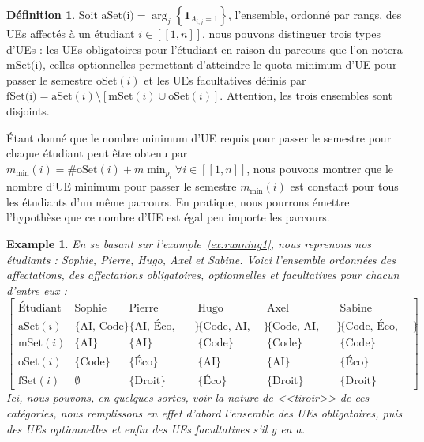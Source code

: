 \documentclass{rapport}
\theoremstyle{definition}
\newtheorem{definition}{Définition}
\theoremstyle{remark}
\theoremstyle{plain}
\newtheorem{example}{Example}
\theoremstyle{definition}
\theoremstyle{remark}
\newcommand{\llbracket}{[\![}
\newcommand{\rrbracket}{]\!]}
\begin{document}
\begin{definition}
    Soit $\text{aSet(i)}=\arg_j\left\{\mathbf{1}_{A_{i,j}=1}\right\}$, l'ensemble, ordonné par rangs, des UEs affectés à un étudiant $i\in \llbracket 1,n\rrbracket$, nous pouvons distinguer trois types d'UEs :
    les UEs obligatoires pour l'étudiant en raison du parcours que l'on notera $\text{mSet(i)}$,
    celles optionnelles permettant d'atteindre le quota minimum d'UE pour passer le semestre $\text{oSet}(i)$
    et les UEs facultatives définis par $\text{fSet(i)} = \text{aSet}(i)\setminus[\text{mSet}(i)\cup\text{oSet}(i)]$.
    Attention, les trois ensembles sont disjoints.
\end{definition}
Étant donné que le nombre minimum d'UE requis pour passer le semestre pour chaque étudiant peut être obtenu par $m_{\min}(i)=\#\text{oSet}(i)+m\!\min_{p_i} \forall i \in \llbracket 1,n \rrbracket$,
nous pouvons montrer que le nombre d'UE minimum pour passer le semestre $m_{\min}(i)$ est constant pour tous les étudiants d'un même parcours. En pratique, nous pourrons émettre l'hypothèse que ce nombre d'UE
est égal peu importe les parcours.

\begin{example}\label{ex:running2}
    En se basant sur l'example~\ref{ex:running1}, nous reprenons nos étudiants : Sophie, Pierre, Hugo, Axel et Sabine. Voici l'ensemble ordonnées des affectations, des affectations obligatoires, optionnelles et facultatives pour chacun d'entre eux :
    $$
    \begin{bmatrix}
        \text{Étudiant} & \text{Sophie} & \text{Pierre} & \text{Hugo} & \text{Axel} & \text{Sabine}\\
        \text{aSet}(i) & \{\text{AI, Code}\} & \{\text{AI, Éco, Droit}\} & \{\text{Code, AI, Éco}\} & \{\text{Code, AI, Droit}\} & \{\text{Code, Éco, Droit}\}\\
        \text{mSet}(i) & \{\text{AI}\} & \{\text{AI}\} & \{\text{Code}\} & \{\text{Code}\} & \{\text{Code}\}\\
        \text{oSet}(i) & \{\text{Code}\} & \{\text{Éco}\} & \{\text{AI}\} & \{\text{AI}\} & \{\text{Éco}\}\\
        \text{fSet}(i) & \emptyset & \{\text{Droit}\} & \{\text{Éco}\} & \{\text{Droit}\} & \{\text{Droit}\}
    \end{bmatrix}
    $$
    Ici, nous pouvons, en quelques sortes, voir la nature de <<tiroir>> de ces catégories, nous remplissons en effet d'abord l'ensemble des UEs obligatoires, puis des UEs optionnelles et enfin des UEs facultatives s'il y en a.
\end{example}
\end{document}
